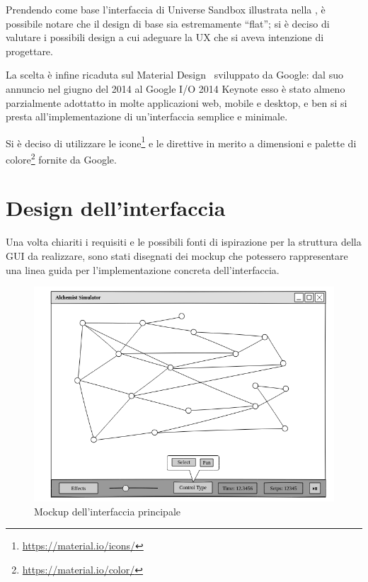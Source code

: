             Prendendo come base l'interfaccia di Universe Sandbox illustrata nella , è possibile notare che il design di base sia estremamente ``flat''; si è deciso di valutare i possibili design a cui adeguare la UX che si aveva intenzione di progettare.

            La scelta è infine ricaduta sul Material Design~\cite{material} sviluppato da Google: dal suo annuncio nel giugno del 2014 al Google I/O 2014 Keynote esso è stato almeno parzialmente adottatto in molte applicazioni web, mobile e desktop, e ben si si presta all'implementazione di un'interfaccia semplice e minimale.

            Si è deciso di utilizzare le icone\footnote{\url{https://material.io/icons/}} e le direttive in merito a dimensioni e palette di colore\footnote{\url{https://material.io/color/}} fornite da Google.

    \section{Design dell'interfaccia}\label{sec:design}
        Una volta chiariti i requisiti e le possibili fonti di ispirazione per la struttura della GUI da realizzare, sono stati disegnati dei mockup che potessero rappresentare una linea guida per l'implementazione concreta dell'interfaccia.

        \begin{figure}[htbp]
            \centering
            \includegraphics[scale=0.5]{img/withNodes/main_window}
            \caption{Mockup dell'interfaccia principale}
            \label{fig:mock:mainWindow}
        \end{figure}

